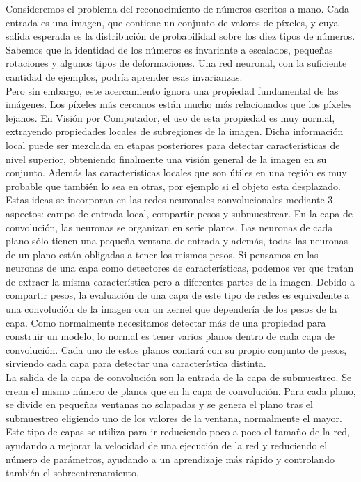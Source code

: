 Consideremos el problema del reconocimiento de números escritos a mano. Cada entrada es una imagen, que contiene un conjunto de valores de píxeles, y cuya salida esperada es la distribución de probabilidad sobre los diez tipos de números. Sabemos que la identidad de los números es invariante a escalados, pequeñas rotaciones y algunos tipos de deformaciones. Una red neuronal, con la suficiente cantidad de ejemplos, podría aprender esas invarianzas.\\

Pero sin embargo, este acercamiento ignora una propiedad fundamental de las imágenes. Los píxeles más cercanos están mucho más relacionados que los píxeles lejanos. En Visión por Computador, el uso de esta propiedad es muy normal, extrayendo propiedades locales de subregiones de la imagen. Dicha información local puede ser mezclada en etapas posteriores para detectar características de nivel superior, obteniendo finalmente una visión general de la imagen en su conjunto. Además las características locales que son útiles en una región es muy probable que también lo sea en otras, por ejemplo si el objeto esta desplazado.\\

Estas ideas se incorporan en las redes neuronales convolucionales mediante 3 aspectos: campo de entrada local, compartir pesos y submuestrear. En la capa de convolución, las neuronas se organizan en serie planos. Las neuronas de cada plano sólo tienen una pequeña ventana de entrada y además, todas las neuronas de un plano están obligadas a tener los mismos pesos. Si pensamos en las neuronas de una capa como detectores de características, podemos ver que tratan de extraer la misma característica pero a diferentes partes de la imagen. Debido a compartir pesos, la evaluación de una capa de este tipo de redes es equivalente a una convolución de la imagen con un kernel que dependería de los pesos de la capa. Como normalmente necesitamos detectar más de una propiedad para construir un modelo, lo normal es tener varios planos dentro de cada capa de convolución. Cada uno de estos planos contará con su propio conjunto de pesos, sirviendo cada capa para detectar una característica distinta.\\

La salida de la capa de convolución son la entrada de la capa de submuestreo. Se crean el mismo número de planos que en la capa de convolución. Para cada plano, se divide en pequeñas ventanas no solapadas y se genera el plano tras el submuestreo eligiendo uno de los valores de la ventana, normalmente el mayor. Este tipo de capas se utiliza para ir reduciendo poco a poco el tamaño de la red, ayudando a mejorar la velocidad de una ejecución de la red y reduciendo el número de parámetros, ayudando a un aprendizaje más rápido y controlando también el sobreentrenamiento.


